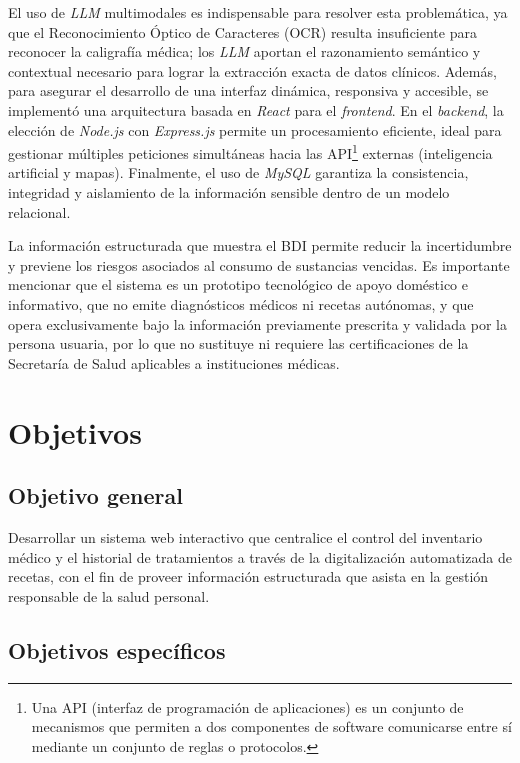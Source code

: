 El uso de \emph{LLM} multimodales es indispensable para resolver esta problemática, ya que el Reconocimiento Óptico de Caracteres (OCR) resulta insuficiente para reconocer la caligrafía médica; los \emph{LLM} aportan el razonamiento semántico y contextual necesario para lograr la extracción exacta de datos clínicos. Además, para asegurar el desarrollo de una interfaz dinámica, responsiva y accesible, se implementó una arquitectura basada en \emph{React} para el \emph{frontend}. En el \emph{backend}, la elección de \emph{Node.js} con \emph{Express.js} permite un procesamiento eficiente, ideal para gestionar múltiples peticiones simultáneas hacia las API\footnote{Una API (interfaz de programación de aplicaciones) es un conjunto de mecanismos que permiten a dos componentes de software comunicarse entre sí mediante un conjunto de reglas o protocolos.\cite{apidef}} externas (inteligencia artificial y mapas). Finalmente, el uso de \emph{MySQL} garantiza la consistencia, integridad y aislamiento de la información sensible dentro de un modelo relacional.

La información estructurada que muestra el BDI permite reducir la incertidumbre y previene los riesgos asociados al consumo de sustancias vencidas. Es importante mencionar que el sistema es un prototipo tecnológico de apoyo doméstico e informativo, que no emite diagnósticos médicos ni recetas autónomas, y que opera exclusivamente bajo la información previamente prescrita y validada por la persona usuaria, por lo que no sustituye ni requiere las certificaciones de la Secretaría de Salud aplicables a instituciones médicas.

\clearpage

\section{Objetivos}

\subsection{Objetivo general}

Desarrollar un sistema web interactivo que centralice el control del inventario médico y el historial de tratamientos a través de la digitalización automatizada de recetas, con el fin de proveer información estructurada que asista en la gestión responsable de la salud personal.

\subsection{Objetivos específicos}

